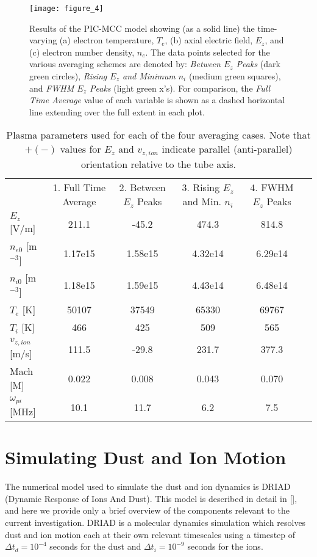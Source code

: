 \documentclass[aip,amsmath,amssymb,graphicx,floatfix,reprint]{revtex4-1}
\begin{document}
\begin{figure}[t]
\texttt{[image: figure\_4]}
\caption{Results of the PIC-MCC model showing (as a solid line) the time-varying (a) electron temperature, $T_e$, (b) axial electric field, $E_z$, and (c) electron number density, $n_e$.  The data points selected for the various averaging schemes are denoted by: \emph{Between $E_z$ Peaks} (dark green circles), \emph{Rising $E_z$ and Minimum $n_i$} (medium green squares), and \emph{FWHM $E_z$ Peaks} (light green x's).  For comparison, the \emph{Full Time Average} value of each variable is shown as a dashed horizontal line extending over the full extent in each plot.}
\label{fig:inputdatacomp}
\end{figure}

\begin{table*}
    \caption{Plasma parameters used for each of the four averaging cases.  Note that $+(-)$ values for $E_z$ and $v_{z,ion}$ indicate parallel (anti-parallel) orientation relative to the tube axis.}
    \label{tab:params}
    \begin{ruledtabular}
    \begin{tabular}{lccccc}

       & 1. Full Time Average & 2. Between $E_z$ Peaks & 3. Rising $E_z$ and Min. $n_i$ & 4. FWHM $E_z$ Peaks \\
       ${E_z}$ [V/m] & 211.1 & -45.2 & 474.3 & 814.8 \\
       ${n_{e0}}$ [m$^{-3}$] & 1.17e15 & 1.58e15 & 4.32e14 & 6.29e14 \\
       ${n_{i0}}$ [m$^{-3}$] & 1.18e15 & 1.59e15 & 4.43e14 & 6.48e14 \\
       ${T_e}$ [K] & 50107 & 37549 & 65330 & 69767 \\
       ${T_i}$ [K] & 466 & 425 & 509 & 565 \\
       ${v_{z,ion}}$ [m/s] & 111.5 & -29.8 & 231.7 & 377.3 \\
       Mach [M] & 0.022 & 0.008 & 0.043 & 0.070 \\
       $\omega_{pi}$ [MHz] & 10.1 & 11.7 & 6.2 & 7.5 \\
      
    \end{tabular}
\end{ruledtabular}
\end{table*}




\section{Simulating Dust and Ion Motion}
\label{model}
The numerical model used to simulate the dust and ion dynamics is DRIAD (Dynamic Response of Ions And Dust).  This model is described in detail in [], and here we provide only a brief overview of the components relevant to the current investigation.  DRIAD is a molecular dynamics simulation which resolves dust and ion motion each at their own relevant timescales using a timestep of $\Delta t_d = 10^{-4} $ seconds for the dust and $\Delta t_i = 10^{-9} $ seconds for the ions.     
\end{document}
